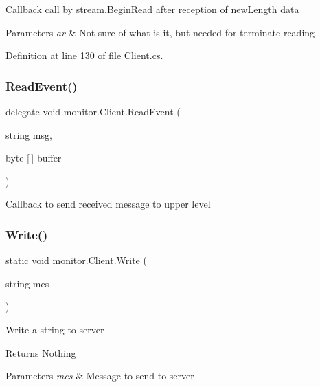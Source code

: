 Callback call by stream.\+Begin\+Read after reception of new\+Length data 


\begin{DoxyParams}{Parameters}
{\em ar} & Not sure of what is it, but needed for terminate reading\\
\hline
\end{DoxyParams}


Definition at line 130 of file Client.\+cs.

\mbox{\label{classmonitor_1_1_client_ae85f4aa567a41488d5c65e470ae15378}} 
\subsubsection{Read\+Event()}
{\footnotesize\ttfamily delegate void monitor.\+Client.\+Read\+Event (\begin{DoxyParamCaption}\item[{string}]{msg,  }\item[{byte [$\,$]}]{buffer }\end{DoxyParamCaption})}



Callback to send received message to upper level 

\mbox{\label{classmonitor_1_1_client_a081413295e7a96662b39b2ddec854b02}} 
\subsubsection{Write()}
{\footnotesize\ttfamily static void monitor.\+Client.\+Write (\begin{DoxyParamCaption}\item[{string}]{mes }\end{DoxyParamCaption})\hspace{0.3cm}{\ttfamily [static]}}



Write a string to server 

\begin{DoxyReturn}{Returns}
Nothing
\end{DoxyReturn}

\begin{DoxyParams}{Parameters}
{\em mes} & Message to send to server\\
\hline
\end{DoxyParams}


